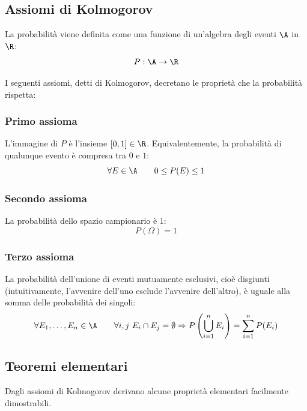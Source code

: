

\subsection{Assiomi di Kolmogorov}
La probabilità viene definita come una funzione di un'algebra degli eventi $\A$ in $\R$:
\begin{equation*}
	P:\A\to\R
\end{equation*}

I seguenti assiomi, detti di Kolmogorov, decretano le proprietà che la probabilità rispetta:


\subsubsection{Primo assioma}
L'immagine di $P$ è l'insieme $[0,1]\in\R$. Equivalentemente, la probabilità di qualunque evento è compresa tra $0$ e $1$:
\begin{equation*}
	\forall E\in\A\qquad 0\leq P(E)\leq 1
\end{equation*}


\subsubsection{Secondo assioma}
La probabilità dello spazio campionario è $1$:
\begin{equation*}
	P(\Omega)=1
\end{equation*}


\subsubsection{Terzo assioma}
La probabilità dell'unione di eventi mutuamente esclusivi, cioè disgiunti (intuitivamente, l'avvenire dell'uno esclude l'avvenire dell'altro), è uguale alla somma delle probabilità dei singoli:
\begin{equation*}
	\forall E_1,\dots,E_n\in\A\qquad \forall i,j~E_i\cap E_j = \emptyset \Rightarrow P\left( \bigcup_{i=1}^n E_i \right)=\sum_{i=1}^n P(E_i)
\end{equation*}



\subsection{Teoremi elementari}
Dagli assiomi di Kolmogorov derivano alcune proprietà elementari facilmente dimostrabili.



